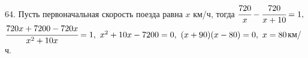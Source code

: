 64. Пусть первоначальная скорость поезда равна $x$ км/ч, тогда $\cfrac{720}{x}-\cfrac{720}{x+10}=1,$\\$ \cfrac{720x+7200-720x}{x^2+10x}=1,\ x^2+10x-7200=0,\
(x+90)(x-80)=0,\ x=80$км/ч.\\
